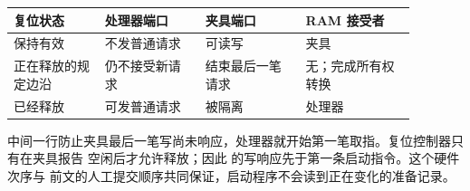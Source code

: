 \begin{longtable}{|L{0.20\linewidth}|L{0.22\linewidth}|L{0.22\linewidth}|L{0.24\linewidth}|}
\hline
{}
复位状态 & 处理器端口 & 夹具端口 & RAM 接受者 \\ \hline
保持有效 & 不发普通请求 & 可读写 & 夹具 \\ \hline
正在释放的规定边沿 & 仍不接受新请求 & 结束最后一笔请求 & 无；完成所有权转换 \\ \hline
已经释放 & 可发普通请求 & 被隔离 & 处理器 \\ \hline
\end{longtable}

中间一行防止夹具最后一笔写尚未响应，处理器就开始第一笔取指。复位控制器只有在夹具报告
空闲后才允许释放；因此  的写响应先于第一条启动指令。这个硬件次序与
前文的人工提交顺序共同保证，启动程序不会读到正在变化的准备记录。
